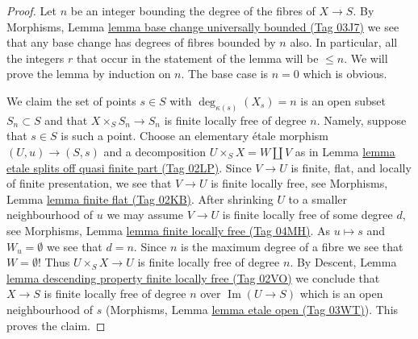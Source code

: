 \documentclass{amsart}
\theoremstyle{plain}
\theoremstyle{definition}
\theoremstyle{remark}
\numberwithin{equation}{subsection}
\def\Im{\mathop{\mathrm{Im}}}
\begin{document}
\begin{proof}
Let $n$ be an integer bounding the degree of the fibres of $X \to S$.
By Morphisms, Lemma \href{https://stacks.math.columbia.edu/tag/03J7}{lemma base change universally bounded (Tag 03J7)}
we see that any base change has degrees of fibres bounded by $n$ also.
In particular, all the integers $r$ that occur in the statement of the lemma
will be $\leq n$. We will prove the lemma by induction on $n$. The base
case is $n = 0$ which is obvious.

\medskip\noindent
We claim the set of points $s \in S$
with $\deg_{\kappa(s)}(X_s) = n$ is an open subset $S_n \subset S$
and that $X \times_S S_n \to S_n$ is finite locally free of degree $n$.
Namely, suppose that $s \in S$ is such a point. Choose an elementary
\'etale morphism $(U, u) \to (S, s)$ and a decomposition
$U \times_S X = W \amalg V$ as in
Lemma \href{https://stacks.math.columbia.edu/tag/02LP}{lemma etale splits off quasi finite part (Tag 02LP)}.
Since $V \to U$ is finite, flat, and locally of finite presentation,
we see that $V \to U$ is finite locally free, see
Morphisms, Lemma \href{https://stacks.math.columbia.edu/tag/02KB}{lemma finite flat (Tag 02KB)}.
After shrinking $U$ to a smaller neighbourhood of $u$
we may assume $V \to U$ is finite locally free of some degree $d$, see
Morphisms, Lemma \href{https://stacks.math.columbia.edu/tag/04MH}{lemma finite locally free (Tag 04MH)}.
As $u \mapsto s$ and $W_u = \emptyset$ we see that $d = n$. Since $n$
is the maximum degree of a fibre we see that $W = \emptyset$!
Thus $U \times_S X \to U$ is finite locally free of degree $n$.
By Descent, Lemma \href{https://stacks.math.columbia.edu/tag/02VO}{lemma descending property finite locally free (Tag 02VO)}
we conclude that $X \to S$ is finite locally free of degree $n$
over $\Im(U \to S)$ which is an open neighbourhood of $s$
(Morphisms, Lemma \href{https://stacks.math.columbia.edu/tag/03WT}{lemma etale open (Tag 03WT)}).
This proves the claim.


\end{proof}
\end{document}
